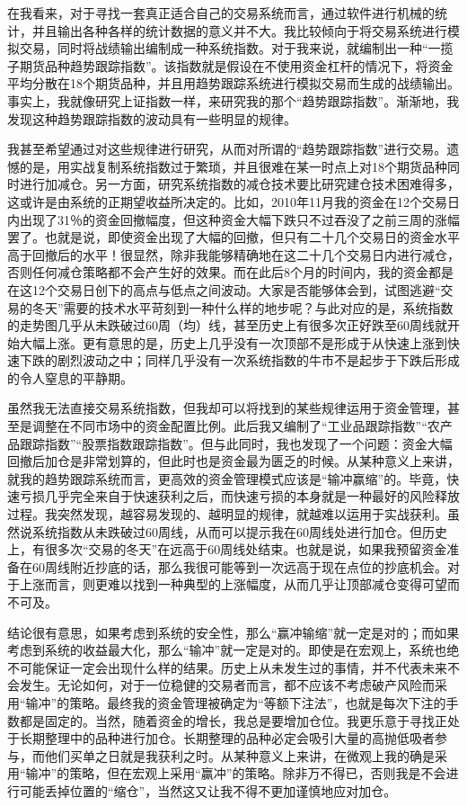 在我看来，对于寻找一套真正适合自己的交易系统而言，通过软件进行机械的统计，并且输出各种各样的统计数据的意义并不大。我比较倾向于将交易系统进行模拟交易，同时将战绩输出编制成一种系统指数。对于我来说，就编制出一种“一揽子期货品种趋势跟踪指数”。该指数就是假设在不使用资金杠杆的情况下，将资金平均分散在18个期货品种，并且用趋势跟踪系统进行模拟交易而生成的战绩输出。事实上，我就像研究上证指数一样，来研究我的那个“趋势跟踪指数”。渐渐地，我发现这种趋势跟踪指数的波动具有一些明显的规律。

我甚至希望通过对这些规律进行研究，从而对所谓的“趋势跟踪指数”进行交易。遗憾的是，用实战复制系统指数过于繁琐，并且很难在某一时点上对18个期货品种同时进行加减仓。另一方面，研究系统指数的减仓技术要比研究建仓技术困难得多，这或许是由系统的正期望收益所决定的。比如，2010年11月我的资金在12个交易日内出现了31％的资金回撤幅度，但这种资金大幅下跌只不过吞没了之前三周的涨幅罢了。也就是说，即使资金出现了大幅的回撤，但只有二十几个交易日的资金水平高于回撤后的水平！很显然，除非我能够精确地在这二十几个交易日内进行减仓，否则任何减仓策略都不会产生好的效果。而在此后8个月的时间内，我的资金都是在这12个交易日创下的高点与低点之间波动。大家是否能够体会到，试图逃避“交易的冬天”需要的技术水平苛刻到一种什么样的地步呢？与此对应的是，系统指数的走势图几乎从未跌破过60周（均）线，甚至历史上有很多次正好跌至60周线就开始大幅上涨。更有意思的是，历史上几乎没有一次顶部不是形成于从快速上涨到快速下跌的剧烈波动之中；同样几乎没有一次系统指数的牛市不是起步于下跌后形成的令人窒息的平静期。

虽然我无法直接交易系统指数，但我却可以将找到的某些规律运用于资金管理，甚至是调整在不同市场中的资金配置比例。此后我又编制了“工业品跟踪指数”“农产品跟踪指数”“股票指数跟踪指数”。但与此同时，我也发现了一个问题：资金大幅回撤后加仓是非常划算的，但此时也是资金最为匮乏的时候。从某种意义上来讲，就我的趋势跟踪系统而言，更高效的资金管理模式应该是“输冲赢缩”的。毕竟，快速亏损几乎完全来自于快速获利之后，而快速亏损的本身就是一种最好的风险释放过程。我突然发现，越容易发现的、越明显的规律，就越难以运用于实战获利。虽然说系统指数从未跌破过60周线，从而可以提示我在60周线处进行加仓。但历史上，有很多次“交易的冬天”在远高于60周线处结束。也就是说，如果我预留资金准备在60周线附近抄底的话，那么我很可能等到一次远高于现在点位的抄底机会。对于上涨而言，则更难以找到一种典型的上涨幅度，从而几乎让顶部减仓变得可望而不可及。

结论很有意思，如果考虑到系统的安全性，那么“赢冲输缩”就一定是对的；而如果考虑到系统的收益最大化，那么“输冲”就一定是对的。即使是在宏观上，系统也绝不可能保证一定会出现什么样的结果。历史上从未发生过的事情，并不代表未来不会发生。无论如何，对于一位稳健的交易者而言，都不应该不考虑破产风险而采用“输冲”的策略。最终我的资金管理被确定为“等额下注法”，也就是每次下注的手数都是固定的。当然，随着资金的增长，我总是要增加仓位。我更乐意于寻找正处于长期整理中的品种进行加仓。长期整理的品种必定会吸引大量的高抛低吸者参与，而他们买单之日就是我获利之时。从某种意义上来讲，在微观上我的确是采用“输冲”的策略，但在宏观上采用“赢冲”的策略。除非万不得已，否则我是不会进行可能丢掉位置的“缩仓”，当然这又让我不得不更加谨慎地应对加仓。

